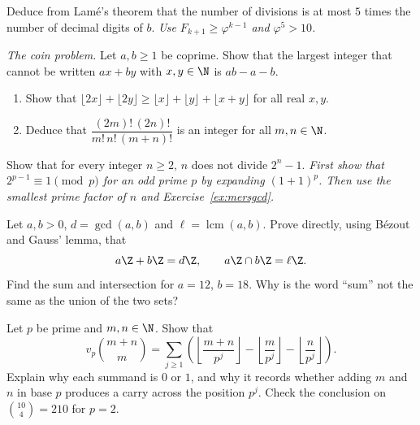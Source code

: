 \begin{exercise}[$\star\star$]\label{ex:lame5}
Deduce from Lam\'e's theorem that the number of divisions is at most $5$ times the number of decimal digits of $b$.
\emph{Use $F_{k+1}\ge\varphi^{k-1}$ and $\varphi^5>10$.}
\end{exercise}

\begin{exercise}[$\star\star$]\label{ex:frob}
\emph{The coin problem.} Let $a,b\ge1$ be coprime. Show that the largest integer that cannot be written $ax+by$ with $x,y\in\N$ is $ab-a-b$.
\end{exercise}

\begin{exercise}[$\star\star\star$]\label{ex:supercat}
\begin{enumerate}[label=(\alph*)]
\item Show that $\lfloor2x\rfloor+\lfloor2y\rfloor\ge\lfloor x\rfloor+\lfloor y\rfloor+\lfloor x+y\rfloor$ for all real $x,y$.
\item Deduce that $\dfrac{(2m)!\,(2n)!}{m!\,n!\,(m+n)!}$ is an integer for all $m,n\in\N$.
\end{enumerate}
\end{exercise}

\begin{exercise}[$\star\star\star$]\label{ex:n2n}
Show that for every integer $n\ge2$, $n$ does not divide $2^n-1$. \emph{First show that $2^{p-1}\equiv1\pmod p$ for an odd prime $p$ by expanding $(1+1)^p$. Then use the smallest prime factor of $n$ and Exercise~\ref{ex:mersgcd}.}
\end{exercise}

\begin{exercise}[$\star\star$]\label{ex:t1-divisibility-lattice}
Let $a,b>0$, $d=\gcd(a,b)$ and $\ell=\operatorname{lcm}(a,b)$. Prove directly, using B\'ezout and Gauss' lemma, that
\[
a\Z+b\Z=d\Z,\qquad a\Z\cap b\Z=\ell\Z.
\]
Find the sum and intersection for $a=12$, $b=18$. Why is the word ``sum'' not the same as the union of the two sets?
\end{exercise}

\begin{exercise}[$\star\star$]\label{ex:t1-binomial-carry}
Let $p$ be prime and $m,n\in\N$. Show that
\[
v_p\binom{m+n}m=
\sum_{j\ge1}\left(\left\lfloor\frac{m+n}{p^j}\right\rfloor-
\left\lfloor\frac m{p^j}\right\rfloor-
\left\lfloor\frac n{p^j}\right\rfloor\right).
\]
Explain why each summand is $0$ or $1$, and why it records whether adding $m$ and $n$ in base $p$ produces a carry across the position $p^j$. Check the conclusion on $\binom{10}4=210$ for $p=2$.
\end{exercise}

